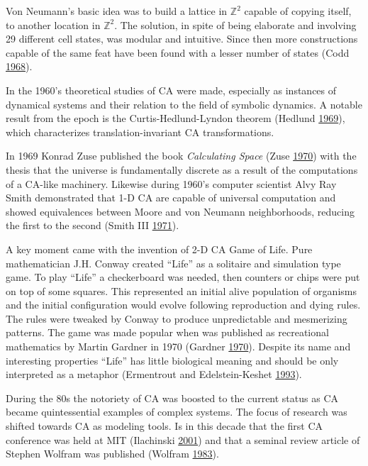 \documentclass[
  openany]{book}
\begin{document}
Von Neumann's basic idea was to build a lattice in \(\mathds{Z}^2\) capable of copying itself, to another location in \(\mathds{Z}^2\). The solution, in spite of being elaborate and involving 29 different cell states, was modular and intuitive. Since then more constructions capable of the same feat have been found with a lesser number of states (Codd \protect\hyperlink{ref-codd1968cellular}{1968}).

In the 1960's theoretical studies of CA were made, especially as instances of dynamical systems and their relation to the field of symbolic dynamics. A notable result from the epoch is the Curtis-Hedlund-Lyndon theorem (Hedlund \protect\hyperlink{ref-hedlund1969endomorphisms}{1969}), which characterizes translation-invariant CA transformations.

In 1969 Konrad Zuse published the book \emph{Calculating Space} (Zuse \protect\hyperlink{ref-zuse1970calculating}{1970}) with the thesis that the universe is fundamentally discrete as a result of the computations of a CA-like machinery. Likewise during 1960's computer scientist Alvy Ray Smith demonstrated that 1-D CA are capable of universal computation and showed equivalences between Moore and von Neumann neighborhoods, reducing the first to the second (Smith III \protect\hyperlink{ref-smith1971simple}{1971}).

A key moment came with the invention of 2-D CA Game of Life. Pure mathematician J.H. Conway created ``Life'' as a solitaire and simulation type game. To play ``Life'' a checkerboard was needed, then counters or chips were put on top of some squares. This represented an initial alive population of organisms and the initial configuration would evolve following reproduction and dying rules. The rules were tweaked by Conway to produce unpredictable and mesmerizing patterns. The game was made popular when was published as recreational mathematics by Martin Gardner in 1970 (Gardner \protect\hyperlink{ref-gardner1970mathematical}{1970}). Despite its name and interesting properties ``Life'' has little biological meaning and should be only interpreted as a metaphor (Ermentrout and Edelstein-Keshet \protect\hyperlink{ref-ermentrout1993cellular}{1993}).

During the 80s the notoriety of CA was boosted to the current status as CA became quintessential examples of complex systems. The focus of research was shifted towards CA as modeling tools. Is in this decade that the first CA conference was held at MIT (Ilachinski \protect\hyperlink{ref-ilachinski2001cellular}{2001}) and that a seminal review article of Stephen Wolfram was published (Wolfram \protect\hyperlink{ref-wolfram1983statistical}{1983}).
\end{document}
